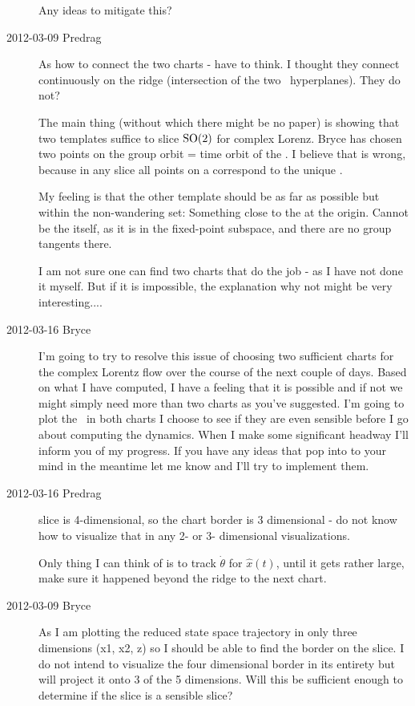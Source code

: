 \begin{description}
Any ideas to mitigate this?

\item[2012-03-09 Predrag]
As how to connect the two charts - have to think. I thought they connect
continuously on the ridge (intersection of the two \slice\ hyperplanes).
They do not?

The main thing (without which there might be no paper) is showing that
two templates suffice to slice $\textrm{SO}(2)$ for complex Lorenz. Bryce has chosen
two points on the group orbit = time orbit of the {\reqv}. I
believe that is wrong, because in any slice all points on a
{\reqv} correspond to the unique {\eqv}.

My feeling is that the other template should be as far as possible but
within the non-wandering set: Something close to the {\eqv} at the
origin. Cannot be the {\eqv} itself, as it is in the fixed-point
subspace, and there are no group tangents there.

I am not sure one can find two charts that do the job - as I have not
done it myself. But if it is impossible, the explanation why not might be
very interesting....

\item[2012-03-16 Bryce]
I'm going to try to resolve this issue of choosing two sufficient charts
for the complex Lorentz flow over the course of the next couple of days.
Based on what I have computed, I have a feeling that it is possible and
if not we might simply need more than two charts as you've suggested. I'm
going to plot the \chartBord\ in both charts I choose to see
if they are even sensible before I go about computing the dynamics. When
I make some significant headway I'll inform you of my progress. If you
have any ideas that pop into to your mind in the meantime let me know and
I'll try to implement them.

\item[2012-03-16 Predrag]
slice is 4-dimensional, so the chart border is 3 dimensional - do not
know how to visualize that in any 2- or 3- dimensional visualizations.

Only thing I can think of is to track $\dot{\theta}$ for $\hat{x}(t)$,
until it gets rather large, make sure it happened beyond the ridge to the
next chart.

\item[2012-03-09 Bryce]
As I am plotting the reduced state space trajectory in only three
dimensions (x1, x2, z) so I should be able to find the border on the
slice. I do not intend to visualize the four dimensional border in its
entirety but will project it onto 3 of the 5 dimensions. Will this be
sufficient enough to determine if the slice is a sensible slice?


\end{description}

